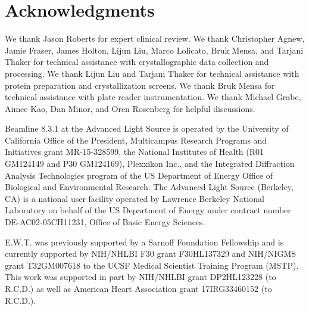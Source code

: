 \section{Acknowledgments}
We thank Jason Roberts for expert clinical review. We thank Christopher Agnew, Jamie Fraser, James Holton, Lijun Liu, Marco Lolicato, Bruk Mensa, and Tarjani Thaker for technical assistance with crystallographic data collection and processing. We thank Lijun Liu and Tarjani Thaker for technical assistance with protein preparation and crystallization screens. We thank Bruk Mensa for technical assistance with plate reader instrumentation. We thank Michael Grabe, Aimee Kao, Dan Minor, and Oren Rosenberg for helpful discussions. 

Beamline 8.3.1 at the Advanced Light Source is operated by the University of California Office of the President, Multicampus Research Programs and Initiatives grant MR-15-328599, the National Institutes of Health (R01 GM124149 and P30 GM124169), Plexxikon Inc., and the Integrated Diffraction Analysis Technologies program of the US Department of Energy Office of Biological and Environmental Research. The Advanced Light Source (Berkeley, CA) is a national user facility operated by Lawrence Berkeley National Laboratory on behalf of the US Department of Energy under contract number DE-AC02-05CH11231, Office of Basic Energy Sciences. 

E.W.T. was previously supported by a Sarnoff Foundation Fellowship and is currently supported by NIH/NHLBI F30 grant F30HL137329 and NIH/NIGMS grant T32GM007618 to the UCSF Medical Scientist Training Program (MSTP). This work was supported in part by NIH/NHLBI grant DP2HL123228 (to R.C.D.) as well as American Heart Association grant 17IRG33460152 (to R.C.D.).